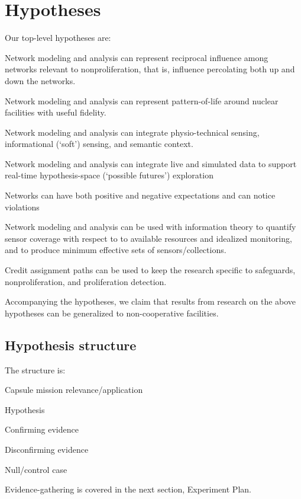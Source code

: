 \documentclass{article} %
\begin{document}
\section{Hypotheses}
\noindent Our top-level hypotheses are:
\renewcommand\labelitemi{\tiny$\bullet$}
\begin{enumerate*}
\item Network modeling and analysis can represent reciprocal influence among networks relevant to nonproliferation, that is, influence percolating both up and down the networks.
\item Network modeling and analysis can represent pattern-of-life around nuclear facilities with useful fidelity.
\item Network modeling and analysis can integrate physio-technical sensing, informational (`soft') sensing, and semantic context.
\item Network modeling and analysis can integrate  live and simulated data to support real-time hypothesis-space (`possible futures') exploration
\item Networks can have both positive and negative expectations and can notice violations
\item Network modeling and analysis can be used with information theory to quantify sensor coverage with respect to to available resources and idealized monitoring, and to produce minimum effective sets of sensors/collections.
\item Credit assignment paths can be used to keep the research specific to safeguards, nonproliferation, and proliferation detection.
\end{enumerate*}

\noindent Accompanying the hypotheses, we claim that results from research on the above hypotheses can be generalized to non-cooperative facilities.

\subsection{Hypothesis structure}
The structure is:
\begin{itemize*}
\item Capsule mission relevance/application
\item Hypothesis
\item Confirming evidence
\item Disconfirming evidence
\item Null/control case
\end{itemize*}
Evidence-gathering is covered in the next section, Experiment Plan.
\end{document}
